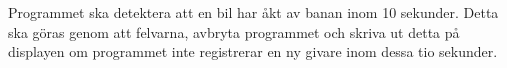Programmet ska detektera att en bil har åkt av banan inom 10 sekunder. Detta
ska göras genom att felvarna, avbryta programmet och skriva ut detta på
displayen om programmet inte registrerar en ny givare inom dessa tio sekunder.
